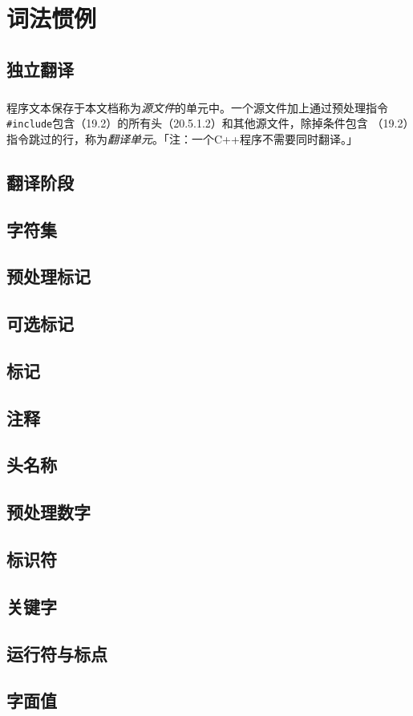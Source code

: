 \chapter{词法惯例}

\section{独立翻译}

\paragraph{}
程序文本保存于本文档称为\textit{源文件}的单元中。一个源文件加上通过预处理指令
\texttt{\#include}包含（19.2）的所有头（20.5.1.2）和其他源文件，除掉条件包含
（19.2）指令跳过的行，称为\textit{翻译单元}。「注：一个C++程序不需要同时翻译。」

\section{翻译阶段}
\section{字符集}
\section{预处理标记}
\section{可选标记}
\section{标记}
\section{注释}
\section{头名称}
\section{预处理数字}
\section{标识符}
\section{关键字}
\section{运行符与标点}
\section{字面值}
